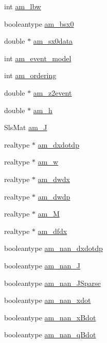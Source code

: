 \begin{DoxyCompactItemize}
\item 
int \hyperlink{struct_user_data_a0fd271dea83e804c7b1ef82a2b0ab76c}{am\+\_\+lbw}
\item 
booleantype \hyperlink{struct_user_data_a87d2f917b1bea7fea2d5878ccd43c7db}{am\+\_\+bsx0}
\item 
double $\ast$ \hyperlink{struct_user_data_a7ac27602345668b3a2bcabac4c7af733}{am\+\_\+sx0data}
\item 
int \hyperlink{struct_user_data_ace3cae0f78a3365a5fac7d7daa9928ff}{am\+\_\+event\+\_\+model}
\item 
int \hyperlink{struct_user_data_a260a14e35469f1516b194f4f065a9794}{am\+\_\+ordering}
\item 
double $\ast$ \hyperlink{struct_user_data_af16fc75b57c68ab1d3784cc71ab073a9}{am\+\_\+z2event}
\item 
double $\ast$ \hyperlink{struct_user_data_a1a976a80dc74446059468485a0f279e1}{am\+\_\+h}
\item 
Sls\+Mat \hyperlink{struct_user_data_a822be7d2872832008aa0b7c0282b04f6}{am\+\_\+\+J}
\item 
realtype $\ast$ \hyperlink{struct_user_data_a04716137a064f7c6d85c04aeb235b4f0}{am\+\_\+dxdotdp}
\item 
realtype $\ast$ \hyperlink{struct_user_data_a8ecd7286d3c2cd32378874fb1be8da37}{am\+\_\+w}
\item 
realtype $\ast$ \hyperlink{struct_user_data_a0dee61b81181232717bffd84f3535b53}{am\+\_\+dwdx}
\item 
realtype $\ast$ \hyperlink{struct_user_data_a7a0e690a17e9784061b5d50b6eafa442}{am\+\_\+dwdp}
\item 
realtype $\ast$ \hyperlink{struct_user_data_aed8938f3dd5b3c2a72c41d09907ec435}{am\+\_\+\+M}
\item 
realtype $\ast$ \hyperlink{struct_user_data_add62c739ea5cc6d2a6be03eb2bbdfe95}{am\+\_\+dfdx}
\item 
booleantype \hyperlink{struct_user_data_a82073e35d78644037fb7570a4608d6de}{am\+\_\+nan\+\_\+dxdotdp}
\item 
booleantype \hyperlink{struct_user_data_a9e2b4f94b4dbe949e636af5cabbd47cf}{am\+\_\+nan\+\_\+\+J}
\item 
booleantype \hyperlink{struct_user_data_a56f3a28c756fe2ec27609fc7b6b8eba7}{am\+\_\+nan\+\_\+\+J\+Sparse}
\item 
booleantype \hyperlink{struct_user_data_a53aa8cfb8e4f8c3b6684b6947cc1f5c8}{am\+\_\+nan\+\_\+xdot}
\item 
booleantype \hyperlink{struct_user_data_a31f1bd5bfd2c4b1e679b77a96a35e912}{am\+\_\+nan\+\_\+x\+Bdot}
\item 
booleantype \hyperlink{struct_user_data_ae0ff98d15a201a25bab372fe26bd1523}{am\+\_\+nan\+\_\+q\+Bdot}
\end{DoxyCompactItemize}


